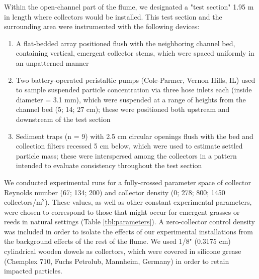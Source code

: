 \documentclass[geosciences,article,submit,moreauthors,pdftex]{Definitions/mdpi}
\begin{document}
Within the open-channel part of the flume, we designated a "test section" 1.95 m in length where collectors would be installed. This test section and the surrounding area were instrumented with the following devices:
\begin{enumerate}
     \item A flat-bedded array positioned flush with the neighboring channel bed, containing vertical, emergent collector stems, which were spaced uniformly in an unpatterned manner
    \item Two battery-operated peristaltic pumps (Cole-Parmer, Vernon Hills, IL) used to sample suspended particle concentration via three hose inlets each (inside diameter = 3.1 mm), which were suspended at a range of heights from the channel bed (5; 14; 27 cm); these were positioned both upstream and downstream of the test section 
   \item Sediment traps (n = 9) with 2.5 cm circular openings flush with the bed and collection filters recessed 5 cm below, which were used to estimate settled particle mass; these were interspersed among the collectors in a pattern intended to evaluate consistency throughout the test section
\end{enumerate}

We conducted experimental runs for a fully-crossed parameter space of collector Reynolds number (67; 134; 200) and collector density (0; 278; 800; 1450 collectors/m$^2$). These values, as well as other constant experimental parameters, were chosen to correspond to those that might occur for emergent grasses or reeds in natural settings (Table \ref{tbl:parameters}). A zero-collector control density was included in order to isolate the effects of our experimental installations from the background effects of the rest of the flume. We used 1/8" (0.3175 cm) cylindrical wooden dowels as collectors, which were covered in silicone grease (Chemplex 710, Fuchs Petrolub, Mannheim, Germany) in order to retain impacted particles. 
\end{document}
